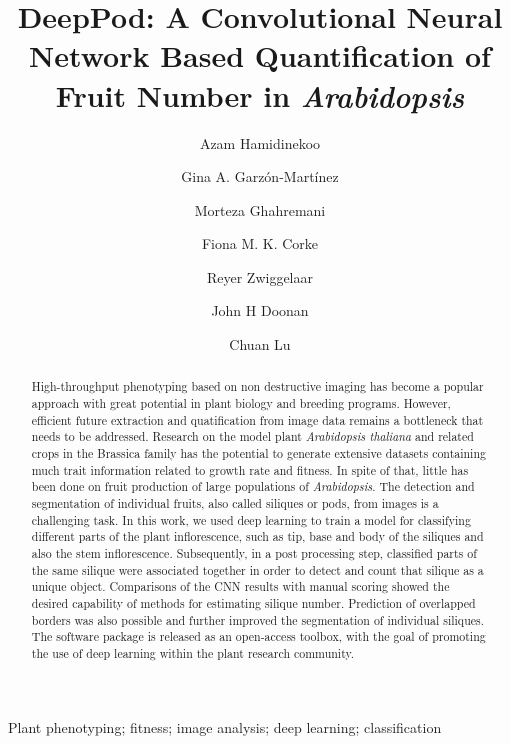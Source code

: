 \documentclass[a4paper,num-refs]{oup-contemporary}
\title{DeepPod: A Convolutional Neural Network Based Quantification of Fruit Number  in \textit{Arabidopsis}}
\author[1,\authfn{1},\authfn{2}]{Azam Hamidinekoo}
\author[2,\authfn{1},\authfn{2}]{Gina A. Garzón-Martínez}
\author[1]{Morteza Ghahremani}
\author[2]{Fiona M. K. Corke}
\author[1]{Reyer Zwiggelaar}
\author[2]{John H Doonan}
\author[1,\authfn{1},\authfn{3}]{Chuan Lu}
\affil[1]{Department of Computer Science, Aberystwyth University, Aberystwyth, United Kingdom}
\affil[2]{National Plant Phenomics Centre, Institute of Biological, Environmental and Rural Sciences, Aberystwyth University, Aberystwyth, United Kingdom}
\begin{document}
\begin{frontmatter}
\maketitle
\begin{abstract}
High-throughput phenotyping based on non destructive imaging has become a popular approach with great potential in plant biology and breeding programs. However, efficient future extraction and quatification from image data remains a bottleneck that needs to be addressed. Research on the model plant \textit{Arabidopsis thaliana} and related crops in the Brassica family has the potential to generate extensive datasets containing much trait information related to growth rate and fitness. In spite of that, little has been done on fruit production of large populations of \textit{Arabidopsis}. The detection and segmentation of individual fruits, also called siliques or pods, from images is a challenging task. In this work, we used deep learning to train a model for classifying different parts of the plant inflorescence, such as tip, base and body of the siliques and also the stem inflorescence. Subsequently, in a post processing step, classified parts of the same silique were associated together in order to detect and count that silique as a unique object. Comparisons of the CNN results with manual scoring showed the desired capability of methods for estimating silique number. Prediction of overlapped borders was also possible and further improved the segmentation of individual siliques. The software package is released as an open-access toolbox, with the goal of promoting the use of deep learning within the plant research community.
\end{abstract}

\begin{keywords}
Plant phenotyping; fitness; image analysis; deep learning; classification
\end{keywords}
\end{frontmatter}

\end{document}
